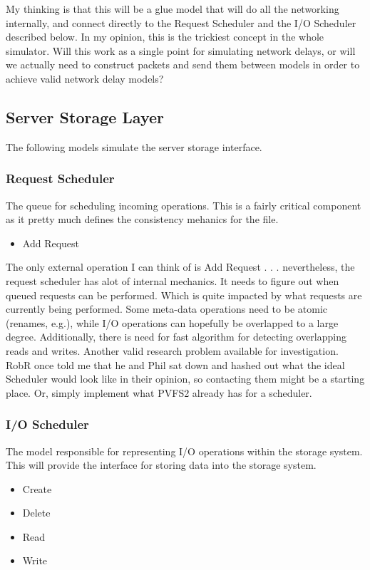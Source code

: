 \documentclass[11pt]{article}
\begin{document}
My thinking is that this will be a glue model that will do all the networking
internally, and connect directly to the Request Scheduler and the I/O
Scheduler described below.  In my opinion, this is the trickiest concept in
the whole simulator.  Will this work as a single point for simulating network
delays, or will we actually need to construct packets and send them between
models in order to achieve valid network delay models?

\subsection{Server Storage Layer}
The following models simulate the server storage interface.

\subsubsection{Request Scheduler}
The queue for scheduling incoming operations.  This is a fairly critical
component as it pretty much defines the consistency mehanics for the file.

\begin{itemize}
\item Add Request
\end{itemize}

The only external operation I can think of is Add Request . . . nevertheless,
the request scheduler has alot of internal mechanics.  It needs to figure out
when queued requests can be performed.  Which is quite impacted by what
requests are currently being performed.  Some meta-data operations need to be
atomic (renames, e.g.), while I/O operations can hopefully be overlapped to a
large degree.  Additionally, there is need for fast algorithm for detecting
overlapping reads and writes.  Another valid research problem available for
investigation.  RobR once told me that he and Phil sat down and hashed out
what the ideal Scheduler would look like in their opinion, so contacting them
might be a starting place.  Or, simply implement what PVFS2 already has for a
scheduler.

\subsubsection{I/O Scheduler}
The model responsible for representing I/O operations within the storage
system.  This will provide the interface for storing data into the storage
system.

\begin{itemize}
\item Create
\item Delete
\item Read
\item Write
\end{itemize}
\end{document}
